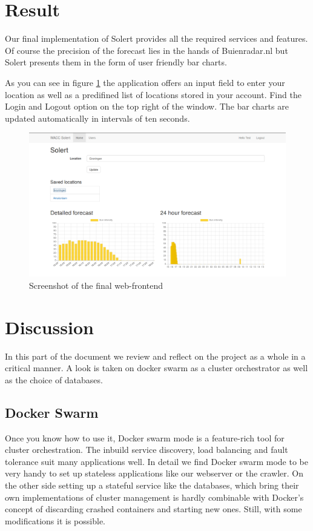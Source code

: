 \documentclass[a4paper]{article}
\begin{document}
\section{Result}

Our final implementation of Solert provides all the required services and features. Of course the precision of the forecast lies in the hands of Buienradar.nl but Solert presents them in the form of user friendly bar charts.

As you can see in figure \ref{fig:screenshot} the application offers an input field to enter your location as well as a predifined list of locations stored in your account. Find the Login and Logout option on the top right of the window.
The bar charts are updated automatically in intervals of ten seconds.

\begin{figure}[ht]
	\centering
	\includegraphics[width = \linewidth]{screenshot}
	\caption{Screenshot of the final web-frontend}
	\label{fig:screenshot}
\end{figure}

\section{Discussion}
In this part of the document we review and reflect on the project as a whole in a critical manner. A look is taken on docker swarm as a cluster orchestrator as well as the choice of databases.

\subsection{Docker Swarm}
Once you know how to use it, Docker swarm mode is a feature-rich tool for cluster orchestration. The inbuild service discovery, load balancing and fault tolerance suit many applications well. In detail we find Docker swarm mode to be very handy to set up stateless applications like our webserver or the crawler. On the other side setting up a stateful service like the databases, which bring their own implementations of cluster management is hardly combinable with Docker's concept of discarding crashed containers and starting new ones. Still, with some modifications it is possible.
\end{document}
